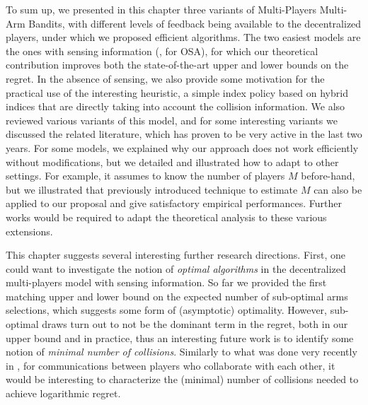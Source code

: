 To sum up, we presented in this chapter three variants of Multi-Players Multi-Arm Bandits,
with different levels of feedback being available to the decentralized players, under which we proposed efficient algorithms.
The two easiest models are the ones with sensing information (\ie, for OSA), for which our theoretical contribution improves both the state-of-the-art upper and lower bounds on the regret. In the absence of sensing, we also provide some motivation for the practical use of the interesting \Selfish{} heuristic, a simple index policy based on hybrid indices that are directly taking  into account the collision information.
%
We also reviewed various variants of this model, and for some interesting variants we discussed the related literature, which has proven to be very active in the last two years. For some models, we explained why our approach does not work efficiently without modifications, but we detailed and illustrated how to adapt \MCTopM{} to other settings.
For example, it assumes to know the number of players $M$ before-hand, but we illustrated that previously introduced technique to estimate $M$ can also be applied to our proposal and give satisfactory empirical performances.
Further works would be required to adapt the theoretical analysis to these various extensions.

This chapter suggests several interesting further research directions.
First, one could want to investigate the notion of \emph{optimal algorithms} in the decentralized multi-players model with sensing information. So far we provided the first matching upper and lower bound on the expected number of sub-optimal arms selections, which suggests some form of (asymptotic) optimality. However, sub-optimal draws turn out to not be the dominant term in the regret, both in our upper bound and in practice, thus an interesting future work is to identify some notion of \emph{minimal number of collisions}.
Similarly to what was done very recently in \cite{wang2019distributed}, for communications between players who collaborate with each other, it would be interesting to characterize the (minimal) number of collisions needed to achieve logarithmic regret.



